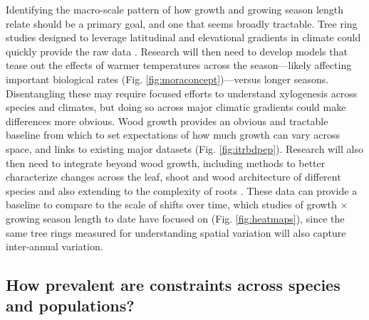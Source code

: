 \documentclass[11pt]{article}
\begin{document}
Identifying the macro-scale pattern of how growth and growing season length relate should be a primary goal, and one that seems broadly tractable. Tree ring studies designed to leverage latitudinal and elevational gradients in climate could quickly provide the raw data \citep{manzanedo2024moving}. Research will then need to develop models that tease out the effects of warmer temperatures across the season---likely affecting important biological rates  (Fig. \ref{fig:moraconcept})---versus longer seasons. Disentangling these may require focused efforts to understand xylogenesis across species and climates, but doing so across major climatic gradients could make differences more obvious. Wood growth provides an obvious and tractable baseline from which to set expectations of how much growth can vary across space, and links to existing major datasets (Fig. \ref{fig:itrbdpep}).  Research will also then need to integrate beyond wood growth, including methods to better characterize changes across the leaf, shoot and wood architecture of different species \citep[e.g.][]{puletti2020lidar,sillett2024ground} and also extending to the complexity of roots \citep{mckown2016impacts,radville2016}. These data can provide a baseline to compare to the scale of shifts over time, which studies of growth $\times$ growing season length to date have focused on (Fig. \ref{fig:heatmaps}), since the same tree rings measured for understanding spatial variation will also capture inter-annual variation. 



\subsection*{How prevalent are constraints across species and populations?} %
\end{document}
